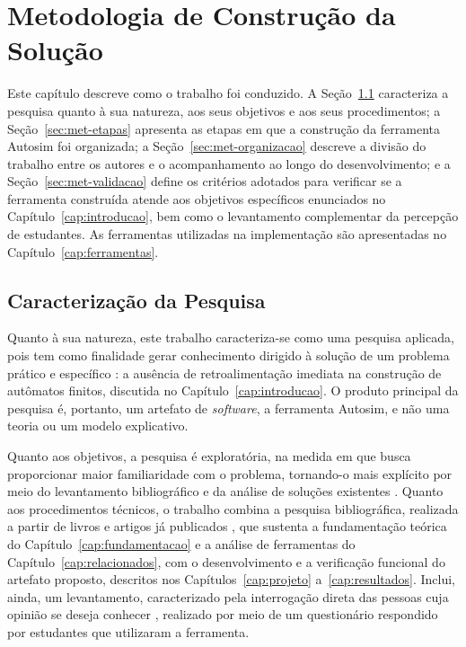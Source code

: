 \documentclass[
    12pt
    ,oneside
    ,a4paper
    ,chapter=TITLE
    ,section=TITLE
    ,sumario=abnt-6027-2012]{abntex2}
\begin{document}
\chapter{Metodologia de Construção da Solução}
\label{cap:metodologia}

Este capítulo descreve como o trabalho foi conduzido. A Seção~\ref{sec:met-caracterizacao}
caracteriza a pesquisa quanto à sua natureza, aos seus objetivos e aos seus procedimentos; a
Seção~\ref{sec:met-etapas} apresenta as etapas em que a construção da ferramenta Autosim foi
organizada; a Seção~\ref{sec:met-organizacao} descreve a divisão do trabalho entre os autores e
o acompanhamento ao longo do desenvolvimento; e a Seção~\ref{sec:met-validacao} define os
critérios adotados para verificar se a ferramenta construída atende aos objetivos específicos
enunciados no Capítulo~\ref{cap:introducao}, bem como o levantamento complementar da
percepção de estudantes. As ferramentas utilizadas na implementação são
apresentadas no Capítulo~\ref{cap:ferramentas}.

\section{Caracterização da Pesquisa}
\label{sec:met-caracterizacao}

Quanto à sua natureza, este trabalho caracteriza-se como uma pesquisa aplicada, pois tem como
finalidade gerar conhecimento dirigido à solução de um problema prático e específico
\cite{gerhardt2009}: a ausência de retroalimentação imediata na construção de autômatos
finitos, discutida no Capítulo~\ref{cap:introducao}. O produto principal da pesquisa é,
portanto, um artefato de \textit{software}, a ferramenta Autosim, e não uma teoria ou um
modelo explicativo.

Quanto aos objetivos, a pesquisa é exploratória, na medida em que busca proporcionar maior
familiaridade com o problema, tornando-o mais explícito por meio do levantamento bibliográfico
e da análise de soluções existentes \cite{gil2002}. Quanto aos procedimentos técnicos, o
trabalho combina a pesquisa bibliográfica, realizada a partir de livros e artigos já
publicados \cite{gil2002}, que sustenta a fundamentação teórica do Capítulo~\ref{cap:fundamentacao}
e a análise de ferramentas do Capítulo~\ref{cap:relacionados}, com o desenvolvimento e a
verificação funcional do artefato proposto, descritos nos Capítulos~\ref{cap:projeto}
a~\ref{cap:resultados}. Inclui, ainda, um levantamento, caracterizado pela interrogação direta
das pessoas cuja opinião se deseja conhecer \cite{gil2002}, realizado por meio de um
questionário respondido por estudantes que utilizaram a ferramenta.
\end{document}
